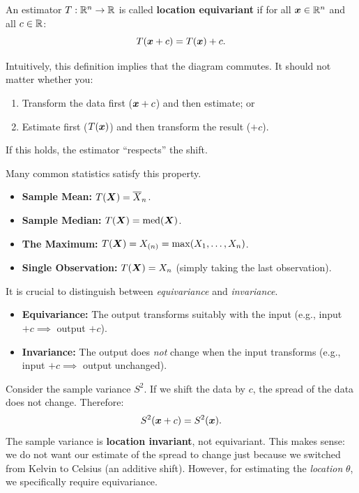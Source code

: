 \begin{definition}
An estimator \(T: \mathbb{R}^n \to \mathbb{R}\) is called \textbf{location equivariant} if for all \(\boldsymbol{x} \in \mathbb{R}^n\) and all \(c \in \mathbb{R}\):
\[
T(\boldsymbol{x} + c) = T(\boldsymbol{x}) + c.
\]
\end{definition}

\begin{note}
Intuitively, this definition implies that the diagram commutes. It should not matter whether you:
\begin{enumerate}
    \item Transform the data first (\(\boldsymbol{x} + c\)) and then estimate; or
    \item Estimate first (\(T(\boldsymbol{x})\)) and then transform the result (\(+c\)).
\end{enumerate}
If this holds, the estimator ``respects'' the shift.
\end{note}

\begin{ex}[]

Many common statistics satisfy this property.
\begin{itemize}
\item \textbf{Sample Mean:} \(T(\boldsymbol{X}) = \overline{X}_n\).
\item \textbf{Sample Median:} \(T(\boldsymbol{X}) = \text{med}(\boldsymbol{X})\).
\item \textbf{The Maximum:} \(T(\boldsymbol{X}) = X_{(n)} = \max(X_1, \dots, X_n)\).
\item \textbf{Single Observation:} \(T(\boldsymbol{X}) = X_n\) (simply taking the last observation).
\end{itemize}
\end{ex}

\medskip

\begin{note}
It is crucial to distinguish between \textit{equivariance} and \textit{invariance}.
\begin{itemize}
    \item \textbf{Equivariance:} The output transforms suitably with the input (e.g., input \(+c \implies\) output \(+c\)).
    \item \textbf{Invariance:} The output does \textit{not} change when the input transforms (e.g., input \(+c \implies\) output unchanged).
\end{itemize}

\begin{ex}
    
Consider the sample variance \(S^2\). If we shift the data by \(c\), the spread of the data does not change. Therefore:
\[ S^2(\boldsymbol{x} + c) = S^2(\boldsymbol{x}). \]
The sample variance is \textbf{location invariant}, not equivariant. This makes sense: we do not want our estimate of the spread to change just because we switched from Kelvin to Celsius (an additive shift). However, for estimating the \textit{location} \(\theta\), we specifically require equivariance.
\end{ex}
\end{note}

